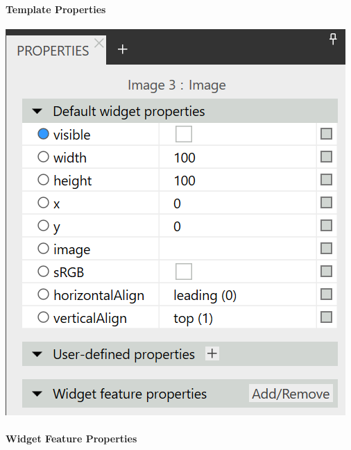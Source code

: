\paragraph{Template Properties}

\begin{center}
  \includegraphics[scale=0.8]{figures/TemplateProperties_Adaption.png}
  \label{fig:TemplateProperties_Adaption}
\end{center}


\paragraph{Widget Feature Properties}

